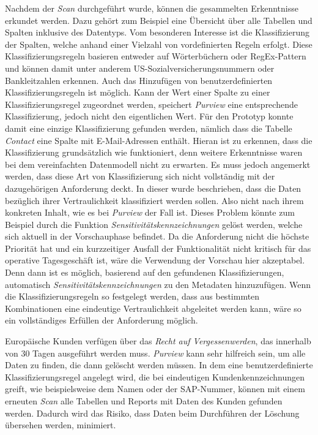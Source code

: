 Nachdem der \textit{Scan} durchgeführt wurde, können die gesammelten Erkenntnisse erkundet werden. Dazu gehört zum Beispiel eine Übersicht über alle Tabellen und Spalten inklusive des Datentyps. Vom besonderen Interesse ist die Klassifizierung der Spalten, welche anhand einer Vielzahl von vordefinierten Regeln erfolgt. Diese Klassifizierungsregeln basieren entweder auf Wörterbüchern oder RegEx-Pattern und können damit unter anderem US-Sozialversicherungsnummern oder Bankleitzahlen erkennen. Auch das Hinzufügen von benutzerdefinierten Klassifizierungsregeln ist möglich. Kann der Wert einer Spalte zu einer Klassifizierungsregel zugeordnet werden, speichert \textit{Purview} eine entsprechende Klassifizierung, jedoch nicht den eigentlichen Wert. Für den Prototyp konnte damit eine einzige Klassifizierung gefunden werden, nämlich dass die Tabelle \textit{Contact} eine Spalte mit E-Mail-Adressen enthält. Hieran ist zu erkennen, dass die Klassifizierung grundsätzlich wie funktioniert, denn weitere Erkenntnisse waren bei dem vereinfachten Datenmodell nicht zu erwarten. Es muss jedoch angemerkt werden, dass diese Art von Klassifizierung sich nicht vollständig mit der dazugehörigen Anforderung deckt. In dieser wurde beschrieben, dass die  Daten bezüglich ihrer Vertraulichkeit klassifiziert werden sollen. Also nicht nach ihrem konkreten Inhalt, wie es bei \textit{Purview} der Fall ist. Dieses Problem könnte zum Beispiel durch die Funktion \textit{Sensitivitätskennzeichnungen} gelöst werden, welche sich aktuell in der Vorschauphase befindet. Da die Anforderung nicht die höchste Priorität hat und ein kurzzeitiger Ausfall der Funktionalität nicht kritisch für das operative Tagesgeschäft ist, wäre die Verwendung der Vorschau hier akzeptabel. Denn dann ist es möglich, basierend auf den gefundenen Klassifizierungen, automatisch \textit{Sensitivitätskennzeichnungen} zu den Metadaten hinzuzufügen. Wenn die Klassifizierungsregeln so festgelegt werden, dass aus bestimmten Kombinationen eine eindeutige Vertraulichkeit abgeleitet werden kann, wäre so ein vollständiges Erfüllen der Anforderung möglich.

Europäische Kunden verfügen über das \textit{Recht auf Vergessenwerden}, das innerhalb von 30 Tagen ausgeführt werden muss. \textit{Purview} kann sehr hilfreich sein, um alle Daten zu finden, die dann gelöscht werden müssen. In dem eine benutzerdefinierte Klassifizierungsregel angelegt wird, die bei eindeutigen Kundenkennzeichnungen greift, wie beispielsweise dem Namen oder der SAP-Nummer, können mit einem erneuten \textit{Scan} alle Tabellen und Reports mit Daten des Kunden gefunden werden. Dadurch wird das Risiko, dass Daten beim Durchführen der Löschung übersehen werden, minimiert.

